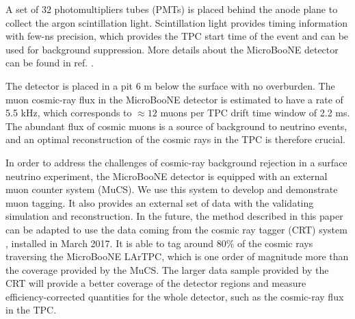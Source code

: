 \documentclass[a4paper,11pt]{article}
\begin{document}
A set of 32 photomultipliers tubes (PMTs) is placed behind the anode plane to collect the argon scintillation light. Scintillation light provides timing information with few-ns precision, which provides the TPC start time of the event and can be used for background suppression. More details about the MicroBooNE detector can be found in ref. \cite{detector}.

The detector is placed in a pit 6 m below the surface with no overburden. The muon cosmic-ray flux in the MicroBooNE detector is estimated to have a rate of 5.5 kHz, which corresponds to $\approx12$ muons per TPC drift time window of 2.2 ms. The abundant flux of cosmic muons is a source of background to neutrino events, and an optimal reconstruction of the cosmic rays in the TPC is therefore crucial.

In order to address the challenges of cosmic-ray background rejection in a surface neutrino experiment, the MicroBooNE detector is equipped with an external muon counter system (MuCS). We use this system to develop and demonstrate muon tagging. It also provides an external set of data with the validating simulation and reconstruction.
In the future, the method described in this paper can be adapted to use the data coming from the cosmic ray tagger (CRT) system \cite{crt}, installed in March 2017. It is able to tag around $80\%$ of the cosmic rays traversing the MicroBooNE LArTPC, which is one order of magnitude more than the coverage provided by the MuCS. The larger data sample provided by the CRT will provide a better coverage of the detector regions and measure efficiency-corrected quantities for the whole detector, such as the cosmic-ray flux in the TPC.
\end{document}
